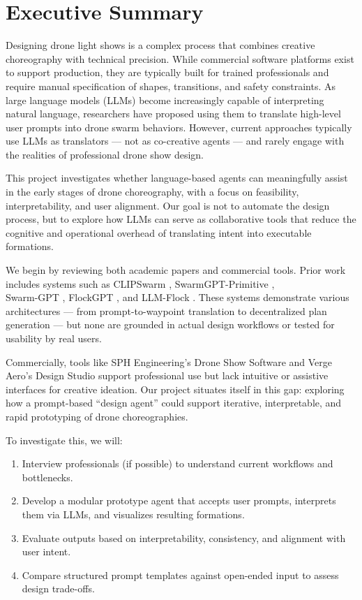 \newpage
\section{Executive Summary}

Designing drone light shows is a complex process that combines creative choreography with technical precision. While commercial software platforms exist to support production, they are typically built for trained professionals and require manual specification of shapes, transitions, and safety constraints. As large language models (LLMs) become increasingly capable of interpreting natural language, researchers have proposed using them to translate high-level user prompts into drone swarm behaviors. However, current approaches typically use LLMs as translators — not as co-creative agents — and rarely engage with the realities of professional drone show design.

This project investigates whether language-based agents can meaningfully assist in the early stages of drone choreography, with a focus on feasibility, interpretability, and user alignment. Our goal is not to automate the design process, but to explore how LLMs can serve as collaborative tools that reduce the cognitive and operational overhead of translating intent into executable formations.

We begin by reviewing both academic papers and commercial tools. Prior work
includes systems such as CLIPSwarm \parencite{pueyo2024clipswarm}, SwarmGPT-Primitive \parencite{jiao2023swarmgpt}, \\
Swarm-GPT \parencite{vyas2024swarmgptprimitive}, FlockGPT \parencite{lykov2024flockgpt}, and LLM-Flock \parencite{li2025llmflock}. These systems demonstrate various architectures — from prompt-to-waypoint translation to decentralized plan generation — but none are grounded in actual design workflows or tested for usability by real users.

Commercially, tools like SPH Engineering's Drone Show Software and Verge Aero's Design Studio support professional use but lack intuitive or assistive interfaces for creative ideation. Our project situates itself in this gap: exploring how a prompt-based “design agent” could support iterative, interpretable, and rapid prototyping of drone choreographies.

To investigate this, we will:
\begin{enumerate}
    \item Interview professionals (if possible) to understand current workflows and bottlenecks.
    \item Develop a modular prototype agent that accepts user prompts, interprets them via LLMs, and visualizes resulting formations.
    \item Evaluate outputs based on interpretability, consistency, and alignment with user intent.
    \item Compare structured prompt templates against open-ended input to assess design trade-offs.  
\end{enumerate}


